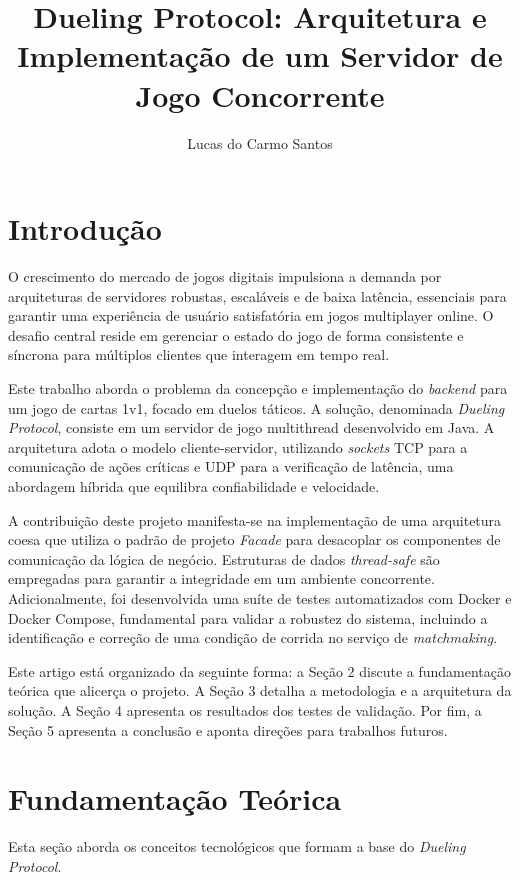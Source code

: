 \documentclass[corpo=12pt,a4paper]{sbc-artigos}
\title{Dueling Protocol: Arquitetura e Implementação de um Servidor de Jogo Concorrente}
\author{Lucas do Carmo Santos}
\begin{document}
\maketitle

\section{Introdução}

O crescimento do mercado de jogos digitais impulsiona a demanda por arquiteturas de servidores robustas, escaláveis e de baixa latência, essenciais para garantir uma experiência de usuário satisfatória em jogos multiplayer online. O desafio central reside em gerenciar o estado do jogo de forma consistente e síncrona para múltiplos clientes que interagem em tempo real. 

Este trabalho aborda o problema da concepção e implementação do \textit{backend} para um jogo de cartas 1v1, focado em duelos táticos. A solução, denominada \textit{Dueling Protocol}, consiste em um servidor de jogo multithread desenvolvido em Java. A arquitetura adota o modelo cliente-servidor, utilizando \textit{sockets} TCP para a comunicação de ações críticas e UDP para a verificação de latência, uma abordagem híbrida que equilibra confiabilidade e velocidade.

A contribuição deste projeto manifesta-se na implementação de uma arquitetura coesa que utiliza o padrão de projeto \textit{Facade} para desacoplar os componentes de comunicação da lógica de negócio. Estruturas de dados \textit{thread-safe} são empregadas para garantir a integridade em um ambiente concorrente. Adicionalmente, foi desenvolvida uma suíte de testes automatizados com Docker e Docker Compose, fundamental para validar a robustez do sistema, incluindo a identificação e correção de uma condição de corrida no serviço de \textit{matchmaking}.

Este artigo está organizado da seguinte forma: a Seção 2 discute a fundamentação teórica que alicerça o projeto. A Seção 3 detalha a metodologia e a arquitetura da solução. A Seção 4 apresenta os resultados dos testes de validação. Por fim, a Seção 5 apresenta a conclusão e aponta direções para trabalhos futuros.

\section{Fundamentação Teórica}

Esta seção aborda os conceitos tecnológicos que formam a base do \textit{Dueling Protocol}.
\end{document}
